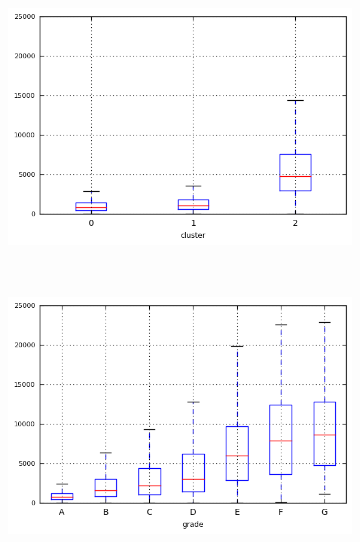\begin{anexosenv}
\begin{figure}[ht!]
\begin{subfigure}[t]{0.45\textwidth}
        \end{subfigure}
\end{figure}



\begin{figure}[ht!]
    \centering
                \caption{\emph{Boxplots} de total\textunderscore rec\textunderscore int }
        \begin{subfigure}[t]{0.45\textwidth}
            \centering

            \centerline{\includegraphics[width=1.05\textwidth]{img/total_rec_int_by_cluster}}
        \end{subfigure}%
        ~ 
        \begin{subfigure}[t]{0.45\textwidth}
            \centering
   
            \centerline{\includegraphics[width=1.05\textwidth]{img/total_rec_int_by_grade}}


\end{subfigure}
\end{figure}
\end{anexosenv}
